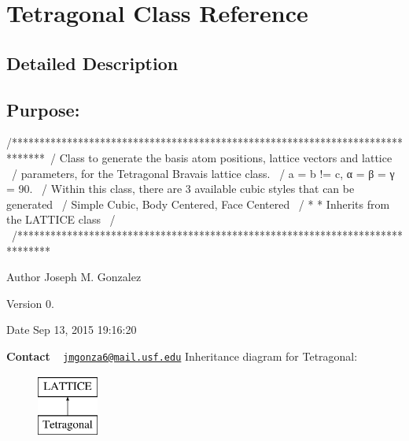 \hypertarget{class_tetragonal}{}\section{Tetragonal Class Reference}
\label{class_tetragonal}


\subsection{Detailed Description}
\subsection*{{\bfseries Purpose\+:} }

\begin{DoxyVerb}/******************************************************************************\
/  Class to generate the basis atom positions, lattice vectors and lattice     \
/  parameters, for the Tetragonal Bravais lattice class.                       \
/  a = b != c, α = β = γ = 90.                                                 \
/  Within this class, there are 3 available cubic styles that can be generated \
/  Simple Cubic, Body Centered, Face Centered                                  \
/  * * Inherits from the LATTICE class                                         \
/                                                                              \ 
/******************************************************************************\
\end{DoxyVerb}


\begin{DoxyAuthor}{Author}
Joseph M. Gonzalez
\end{DoxyAuthor}
\begin{DoxyVersion}{Version}
0.\+1
\end{DoxyVersion}
\begin{DoxyDate}{Date}
Sep 13, 2015 19\+:16\+:20
\end{DoxyDate}
{\bfseries Contact} ~\newline
 \href{mailto:jmgonza6@mail.usf.edu}{\tt jmgonza6@mail.\+usf.\+edu} Inheritance diagram for Tetragonal\+:\begin{figure}[H]
\begin{center}
\leavevmode
\includegraphics[height=2.000000cm]{class_tetragonal}
\end{center}
\end{figure}
